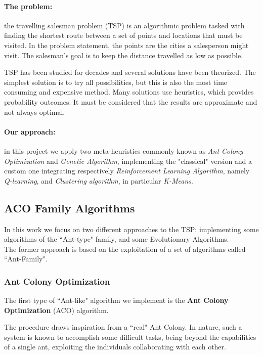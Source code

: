 \documentclass[10pt]{article}
\begin{document}
\paragraph{The problem:}
the travelling salesman problem (TSP) is an algorithmic problem tasked with finding the shortest route between a set of points and locations that must be visited. 
In the problem statement, the points are the cities a salesperson might visit. The salesman's goal is to keep the distance travelled as low as possible. 

TSP has been studied for decades and several solutions have been theorized. 
The simplest solution is to try all possibilities, but this is also the most time consuming and expensive method. 
Many solutions use heuristics, which provides probability outcomes. 
It must be considered that the results are approximate and not always optimal. 
\paragraph{Our approach:}
in this project we apply two meta-heuristics commonly known as \textit{Ant Colony Optimization} and \textit{Genetic Algorithm}, implementing the "classical" version and a custom one integrating respectively \textit{Reinforcement Learning Algorithm}, namely \textit{Q-learning}, and \textit{Clustering algorithm}, in particular \textit{K-Means}.

\subsection{ACO Family Algorithms}
In this work we focus on two different approaches to the TSP: implementing some algorithms of the ``Ant-type" family, and some Evolutionary Algorithms.
\\The former approach is based on the exploitation of a set of algorithms called ``Ant-Family".

\subsubsection{Ant Colony Optimization} \label{sec:aco}
The first type of ``Ant-like" algorithm we implement is the \textbf{Ant Colony Optimization} (ACO) algorithm.

The procedure draws inspiration from a ``real"  Ant  Colony. 
In nature, such a system is  known  to  accomplish  some  difficult  tasks,  being beyond  the capabilities  of  a  single  ant,  exploiting the individuals collaborating  with  each  other.  
\end{document}
